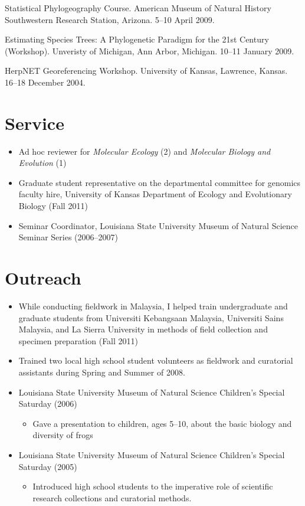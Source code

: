 \documentclass[10pt]{article}
\newenvironment{myItemize}{
  \begin{itemize}
    \setlength{\leftskip}{-4mm}
    \setlength{\itemsep}{0.25em}
    \setlength{\parskip}{0pt}
    \setlength{\parsep}{0.5em}}
  {\end{itemize}}
\begin{document}
\hangindent=5mm
Statistical Phylogeography Course.
American Museum of Natural History Southwestern Research Station, Arizona.
5--10 April 2009.

\hangindent=5mm
Estimating Species Trees: A Phylogenetic Paradigm for the 21st Century (Workshop).
Unveristy of Michigan, Ann Arbor, Michigan.
10--11 January 2009.

\hangindent=5mm
HerpNET Georeferencing Workshop.
University of Kansas, Lawrence, Kansas.
16--18 December 2004.

\section*{Service}
\begin{myItemize}
\item Ad hoc reviewer for \emph{Molecular Ecology} (2) and \emph{Molecular Biology and Evolution} (1)
\item Graduate student representative on the departmental committee for genomics faculty hire, University of Kansas Department of Ecology and Evolutionary Biology (Fall 2011)
\item Seminar Coordinator, Louisiana State University Museum of Natural Science Seminar Series (2006--2007)
\end{myItemize}

\section*{Outreach}
\begin{myItemize}
\item While conducting fieldwork in Malaysia, I helped train undergraduate and graduate students from Universiti Kebangsaan Malaysia, Universiti Sains Malaysia, and La Sierra University in methods of field collection and specimen preparation (Fall 2011)
\item Trained two local high school student volunteers as fieldwork and curatorial assistants during Spring and Summer of 2008.
\item Louisiana State University Museum of Natural Science Children’s Special Saturday (2006)
	\begin{myItemize}
	\item Gave a presentation to children, ages 5--10, about the basic biology and diversity of frogs
	\end{myItemize}
\item Louisiana State University Museum of Natural Science Children’s Special Saturday (2005)
	\begin{myItemize}
	\item Introduced high school students to the imperative role of scientific research collections and curatorial methods.
	\end{myItemize}
\end{myItemize}
\end{document}
